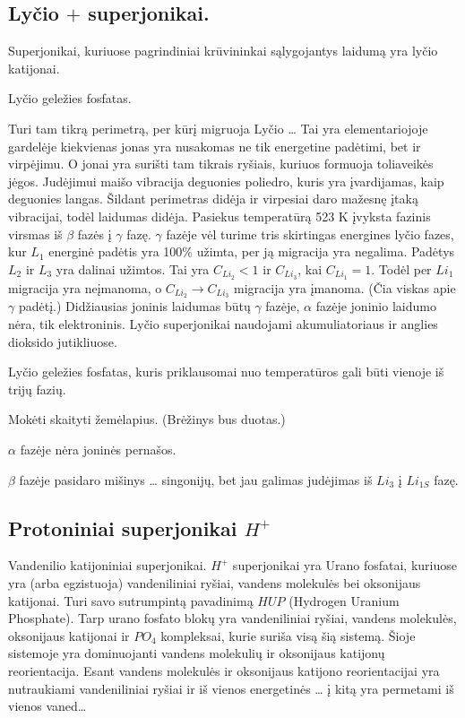 \subsection{Lyčio $+$ superjonikai.}

Superjonikai, kuriuose pagrindiniai krūvininkai sąlygojantys laidumą
yra lyčio katijonai.

Lyčio geležies fosfatas.

Turi tam tikrą perimetrą, per kūrį migruoja Lyčio … Tai yra
elementariojoje gardelėje kiekvienas jonas yra nusakomas ne tik
energetine padėtimi, bet ir virpėjimu. O jonai yra surišti
tam tikrais ryšiais, kuriuos formuoja toliaveikės jėgos.
Judėjimui maišo vibracija deguonies poliedro, kuris yra
įvardijamas, kaip deguonies langas. Šildant perimetras didėja
ir virpesiai daro mažesnę įtaką vibracijai, todėl laidumas didėja.
Pasiekus temperatūrą 523 K įvyksta fazinis virsmas iš
$\beta$ fazės į $\gamma$ fazę. $\gamma$ fazėje vėl turime
tris skirtingas energines lyčio fazes, kur $L_{1}$ energinė
padėtis yra 100\% užimta, per ją migracija yra negalima.
Padėtys $L_{2}$ ir $L_{3}$ yra dalinai užimtos. Tai yra
$C_{Li_{2}} < 1$ ir $C_{Li_{3}}$, kai $C_{Li_{1}} = 1$. Todėl
per $Li_{1}$ migracija yra neįmanoma, o $C_{Li_{2}} → C_{Li_{3}}$
migracija yra įmanoma. (Čia viskas apie $\gamma$ padėtį.)
Didžiausias joninis laidumas būtų $\gamma$ fazėje, $\alpha$
fazėje joninio laidumo nėra, tik elektroninis. Lyčio
superjonikai naudojami akumuliatoriaus ir anglies dioksido
jutikliuose.

\begin{remember}
  \item Lyčio geležies fosfatas, kuris priklausomai nuo temperatūros
    gali būti vienoje iš trijų fazių.
  \item Mokėti skaityti žemėlapius. (Brėžinys bus duotas.)
  \item $\alpha$ fazėje nėra joninės pernašos.
  \item $\beta$ fazėje pasidaro mišinys … singonijų, bet 
    jau galimas judėjimas iš $Li_{3}$ į $Li_{1S}$ fazę.
\end{remember}

\subsection{Protoniniai superjonikai $H^{+}$}

Vandenilio katijoniniai superjonikai. $H^{+}$ superjonikai yra
Urano fosfatai, kuriuose yra (arba egzistuoja) vandeniliniai ryšiai,
vandens molekulės bei oksonijaus katijonai. Turi savo sutrumpintą
pavadinimą $HUP$ (Hydrogen Uranium Phosphate). Tarp urano fosfato
blokų yra vandeniliniai ryšiai, vandens molekulės, oksonijaus
katijonai ir $PO_{4}$ kompleksai, kurie suriša visą šią sistemą.
Šioje sistemoje yra dominuojanti vandens molekulių ir oksonijaus
katijonų reorientacija. Esant vandens molekulės ir oksonijaus
katijono reorientacijai yra nutraukiami vandeniliniai ryšiai ir 
iš vienos energetinės … į kitą yra permetami iš vienos vaned…

